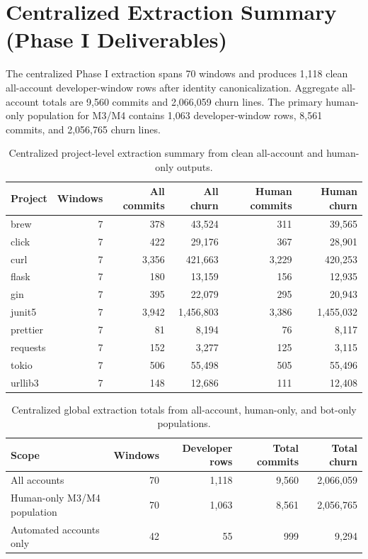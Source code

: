\section{Centralized Extraction Summary (Phase I Deliverables)}
\label{sec:round1_summary}

The centralized Phase I extraction spans 70 windows and produces 1{,}118 clean all-account developer-window rows after identity
canonicalization. Aggregate all-account totals are 9{,}560 commits and 2{,}066{,}059 churn lines. The primary human-only
population for M3/M4 contains 1{,}063 developer-window rows, 8{,}561 commits, and 2{,}056{,}765 churn lines.

\begin{table}[H]
\centering
\scriptsize
\renewcommand{\arraystretch}{1.12}
\begin{tabular}{lrrrrr}
\toprule
\textbf{Project} & \textbf{Windows} & \textbf{All commits} & \textbf{All churn} & \textbf{Human commits} & \textbf{Human churn} \\
\midrule
brew     & 7 & 378   & 43{,}524    & 311   & 39{,}565 \\
click    & 7 & 422   & 29{,}176    & 367   & 28{,}901 \\
curl     & 7 & 3{,}356 & 421{,}663 & 3{,}229 & 420{,}253 \\
flask    & 7 & 180   & 13{,}159    & 156   & 12{,}935 \\
gin      & 7 & 395   & 22{,}079    & 295   & 20{,}943 \\
junit5   & 7 & 3{,}942 & 1{,}456{,}803 & 3{,}386 & 1{,}455{,}032 \\
prettier & 7 & 81    & 8{,}194     & 76    & 8{,}117 \\
requests & 7 & 152   & 3{,}277     & 125   & 3{,}115 \\
tokio    & 7 & 506   & 55{,}498    & 505   & 55{,}496 \\
urllib3  & 7 & 148   & 12{,}686    & 111   & 12{,}408 \\
\bottomrule
\end{tabular}
\caption{Centralized project-level extraction summary from clean all-account and human-only outputs.}
\label{tab:round1_commit_churn_summary}
\end{table}

\begin{table}[H]
\centering
\renewcommand{\arraystretch}{1.15}
\begin{tabular}{lrrrr}
\toprule
\textbf{Scope} & \textbf{Windows} & \textbf{Developer rows} & \textbf{Total commits} & \textbf{Total churn} \\
\midrule
All accounts & 70 & 1{,}118 & 9{,}560 & 2{,}066{,}059 \\
Human-only M3/M4 population & 70 & 1{,}063 & 8{,}561 & 2{,}056{,}765 \\
Automated accounts only & 42 & 55 & 999 & 9{,}294 \\
\bottomrule
\end{tabular}
\caption{Centralized global extraction totals from all-account, human-only, and bot-only populations.}
\label{tab:round1_global_totals}
\end{table}

